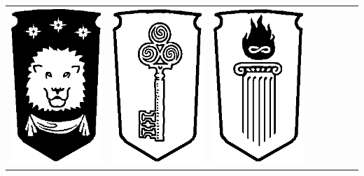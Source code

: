 \begin{center}
\begin{tabular}{@{}cccccccc@{}}
\includegraphics[width=\finallogosize]{pics/logo_huntsman.png} &
\includegraphics[width=\finallogosize]{pics/logo_scholar.png} &
\includegraphics[width=\finallogosize]{pics/logo_fieryheart.png} \tabularnewline
\end{tabular}
\end{center}

\restoregeometry

